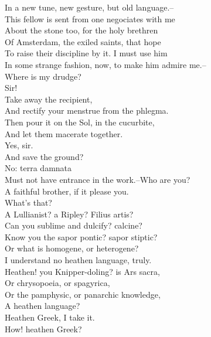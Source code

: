 \documentclass{memoir}
\begin{document}
\begin{drama*}
 In a new tune, new gesture, but old language.--\\
 This fellow is sent from one negociates with me\\
 About the stone too, for the holy brethren\\
 Of Amsterdam, the exiled saints, that hope\\
 To raise their discipline by it. I must use him\\
 In some strange fashion, now, to make him admire me.--\\
 Where is my drudge?\\
\facespeaks {} Sir!\\
\subtlespeaks {} Take away the recipient,\\
 And rectify your menstrue from the phlegma.\\
 Then pour it on the Sol, in the cucurbite,\\
 And let them macerate together.\\
\facespeaks  Yes, sir.\\
 And save the ground?\\
\subtlespeaks {} No: terra damnata\\
 Must not have entrance in the work.--Who are you?\\
\ananiasspeaks  A faithful brother, if it please you.\\
\subtlespeaks {} What's that?\\
 A Lullianist? a Ripley? Filius artis?\\
 Can you sublime and dulcify? calcine?\\
 Know you the sapor pontic? sapor stiptic?\\
 Or what is homogene, or heterogene?\\
\ananiasspeaks  I understand no heathen language, truly.\\
\subtlespeaks  Heathen! you Knipper-doling? is Ars sacra,\\
 Or chrysopoeia, or spagyrica,\\
 Or the pamphysic, or panarchic knowledge,\\
 A heathen language?\\
\ananiasspeaks {} Heathen Greek, I take it.\\
\subtlespeaks  How! heathen Greek?\\

\end{drama*}
\end{document}
